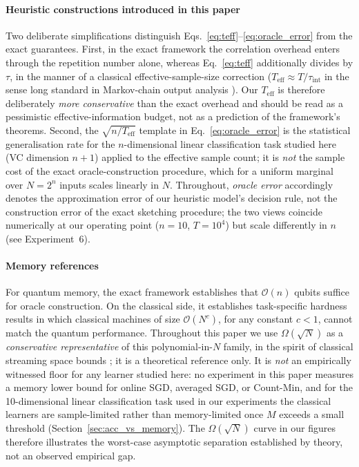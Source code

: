 \documentclass[sensors,article,submit,pdftex,moreauthors]{Definitions/mdpi}
\newcommand{\bigO}{\mathcal{O}}
\newcommand{\Teff}{T_{\mathrm{eff}}}
\begin{document}
\paragraph{Heuristic constructions introduced in this paper} Two deliberate simplifications distinguish Eqs.~\eqref{eq:teff}--\eqref{eq:oracle_error} from the exact guarantees. First, in the exact framework the correlation overhead enters through the repetition number alone, whereas Eq.~\eqref{eq:teff} additionally divides by $\tau$, in the manner of a classical effective-sample-size correction ($\Teff \approx T/\tau_{\mathrm{int}}$ in the sense long standard in Markov-chain output analysis \citep{geyer1992practical}). Our $\Teff$ is therefore deliberately \emph{more conservative} than the exact overhead and should be read as a pessimistic effective-information budget, not as a prediction of the framework's theorems. Second, the $\sqrt{n/\Teff}$ template in Eq.~\eqref{eq:oracle_error} is the statistical generalisation rate for the $n$-dimensional linear classification task studied here (VC dimension $n{+}1$) applied to the effective sample count; it is \emph{not} the sample cost of the exact oracle-construction procedure, which for a uniform marginal over $N = 2^n$ inputs scales linearly in $N$. Throughout, \emph{oracle error} accordingly denotes the approximation error of our heuristic model's decision rule, not the construction error of the exact sketching procedure; the two views coincide numerically at our operating point ($n = 10$, $T = 10^4$) but scale differently in $n$ (see Experiment~6).

\paragraph{Memory references} For quantum memory, the exact framework establishes that $\bigO(n)$ qubits suffice for oracle construction. On the classical side, it establishes task-specific hardness results in which classical machines of size $\bigO(N^{c})$, for any constant $c < 1$, cannot match the quantum performance. Throughout this paper we use $\Omega(\sqrt{N})$ as a \emph{conservative representative} of this polynomial-in-$N$ family, in the spirit of classical streaming space bounds \citep{alon1999space, kallaugher2021streaming}; it is a theoretical reference only. It is \emph{not} an empirically witnessed floor for any learner studied here: no experiment in this paper measures a memory lower bound for online SGD, averaged SGD, or Count-Min, and for the 10-dimensional linear classification task used in our experiments the classical learners are sample-limited rather than memory-limited once $M$ exceeds a small threshold (Section~\ref{sec:acc_vs_memory}). The $\Omega(\sqrt{N})$ curve in our figures therefore illustrates the worst-case asymptotic separation established by theory, not an observed empirical gap.
\end{document}
